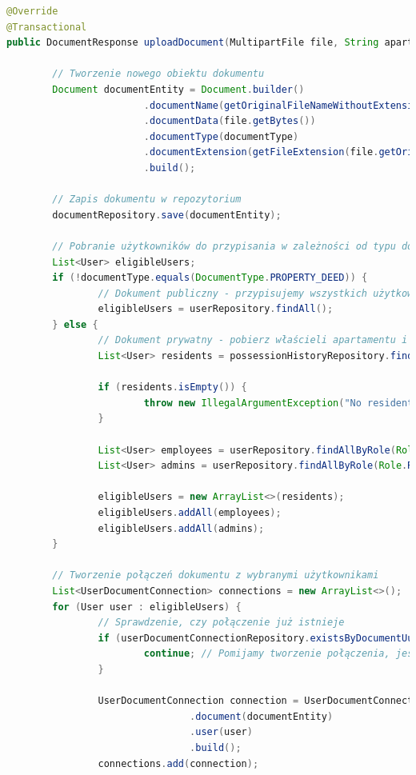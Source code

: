 \begin{lstlisting}[language=Java, style=JavaStyle, caption=Metoda dodawania dokumentu w klasie \texttt{DocumentServiceImp}]
@Override
@Transactional
public DocumentResponse uploadDocument(MultipartFile file, String apartmentSignature, DocumentType documentType) throws IllegalArgumentException, IOException {

		// Tworzenie nowego obiektu dokumentu
		Document documentEntity = Document.builder()
						.documentName(getOriginalFileNameWithoutExtension(file.getOriginalFilename()))
						.documentData(file.getBytes())
						.documentType(documentType)
						.documentExtension(getFileExtension(file.getOriginalFilename()))
						.build();

		// Zapis dokumentu w repozytorium
		documentRepository.save(documentEntity);

		// Pobranie użytkowników do przypisania w zależności od typu dokumentu
		List<User> eligibleUsers;
		if (!documentType.equals(DocumentType.PROPERTY_DEED)) {
				// Dokument publiczny - przypisujemy wszystkich użytkowników
				eligibleUsers = userRepository.findAll();
		} else {
				// Dokument prywatny - pobierz właścieli apartamentu i pracowników oraz adminów
				List<User> residents = possessionHistoryRepository.findActiveResidentsByApartment(apartmentSignature);

				if (residents.isEmpty()) {
						throw new IllegalArgumentException("No residents found in apartment with signature: " + apartmentSignature);
				}

				List<User> employees = userRepository.findAllByRole(Role.ROLE_EMPLOYEE);
				List<User> admins = userRepository.findAllByRole(Role.ROLE_ADMIN);

				eligibleUsers = new ArrayList<>(residents);
				eligibleUsers.addAll(employees);
				eligibleUsers.addAll(admins);
		}

		// Tworzenie połączeń dokumentu z wybranymi użytkownikami
		List<UserDocumentConnection> connections = new ArrayList<>();
		for (User user : eligibleUsers) {
				// Sprawdzenie, czy połączenie już istnieje
				if (userDocumentConnectionRepository.existsByDocumentUuidIDAndUserUuidID(documentEntity.getUuidID(), user.getUuidID())) {
						continue; // Pomijamy tworzenie połączenia, jeśli już istnieje
				}

				UserDocumentConnection connection = UserDocumentConnection.builder()
								.document(documentEntity)
								.user(user)
								.build();
				connections.add(connection);


\end{lstlisting}
